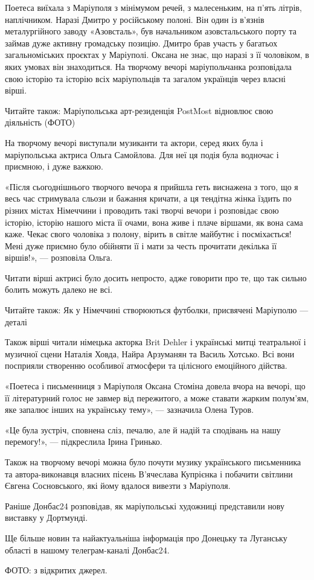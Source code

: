 Поетеса виїхала з Маріуполя з мінімумом речей, з малесеньким, на п'ять літрів,
наплічником. Наразі Дмитро у російському полоні. Він один із в'язнів
металургійного заводу «Азовсталь», був начальником азовстальського порту та
займав дуже активну громадську позицію. Дмитро брав участь у багатьох
загальноміських проєктах у Маріуполі. Оксана не знає, що наразі з її чоловіком,
в яких умовах він знаходиться. На творчому вечорі маріупольчанка розповідала
свою історію та історію всіх маріупольців та загалом українців через власні
вірші.

Читайте також: Маріупольська арт-резиденція PostMost відновлює свою діяльність
(ФОТО)

На творчому вечорі виступали музиканти та актори, серед яких була і
маріупольська актриса Ольга Самойлова. Для неї ця подія була водночас і
приємною, і дуже важкою.

«Після сьогоднішнього творчого вечора я прийшла геть виснажена з того, що я
весь час стримувала сльози и бажання кричати, а ця тендітна жінка їздить по
різних містах Німеччини і проводить такі творчі вечори і розповідає свою
історію, історію нашого міста її очами, вона живе і плаче віршами, як вона сама
каже. Чекає свого чоловіка з полону, вірить в світле майбутнє і посміхається!
Мені дуже приємно було обійняти її і мати за честь прочитати декілька її
віршів!», — розповіла Ольга.

Читати вірші актрисі було досить непросто, адже говорити про те, що так сильно
болить можуть далеко не всі.

Читайте також: Як у Німеччині створюються футболки, присвячені Маріуполю —
деталі

Також вірші читали німецька акторка Brit Dehler і українські митці театральної
і музичної сцени Наталія Ховда, Найра Арзуманян та Василь Хотсько. Всі вони
посприяли створенню особливої атмосфери та цілісного емоційного дійства.

«Поетеса і письменниця з Маріуполя Оксана Стоміна довела вчора на вечорі, що її
літературний голос не завмер від пережитого, а може ставати жарким полум'ям,
яке запалює інших на українську тему», — зазначила Олена Туров. 

«Це була зустріч, сповнена сліз, печалю, але й надій та сподівань на нашу
перемогу!», — підкреслила Ірина Гринько.

Також на творчому вечорі можна було почути музику українського письменника та
автора-виконавця власних пісень В'ячеслава Купрієнка і побачити світлини Євгена
Сосновського, які йому вдалося вивезти з Маріуполя.

Раніше Донбас24 розповідав, як маріупольські художниці представили нову
виставку у Дортмунді.

Ще більше новин та найактуальніша інформація про Донецьку та Луганську області
в нашому телеграм-каналі Донбас24.

ФОТО: з відкритих джерел.
